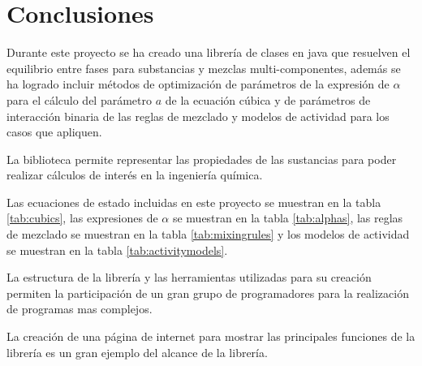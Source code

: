 \chapter{Conclusiones}\label{chap:conclusions}

	Durante este proyecto se ha creado una librería de clases en java que resuelven el equilibrio entre fases para substancias y mezclas multi-componentes, además se ha logrado incluir métodos de optimización de parámetros de la expresión de $\alpha$ para el cálculo del parámetro $a$ de la ecuación cúbica y de parámetros de interacción binaria de las reglas de mezclado y modelos de actividad para los casos que apliquen.

	La biblioteca permite representar las propiedades de las sustancias para poder realizar cálculos de interés en la ingeniería química.

	Las ecuaciones de estado incluidas en este proyecto se muestran en la tabla \ref{tab:cubics}, las expresiones de $\alpha$ se muestran en la tabla \ref{tab:alphas}, las reglas de mezclado se muestran en la tabla \ref{tab:mixingrules} y los modelos de actividad se muestran en la tabla \ref{tab:activitymodels}.

	La estructura de la librería y las herramientas utilizadas para su creación permiten la participación de un gran grupo de programadores para la realización de programas mas complejos.

	La creación de una página de internet para mostrar las principales funciones de la librería es un gran ejemplo del alcance de la librería.


